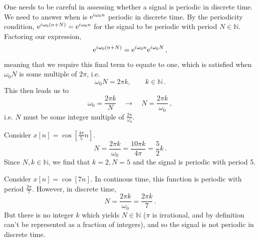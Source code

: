 %
One needs to be careful in assessing whether a signal is periodic in discrete time.
We need to answer when is $\mathrm{e}^{{i\mkern1mu}\omega_0 n}$ periodic in discrete time. By
the periodicity condition, $\mathrm{e}^{{i\mkern1mu}\omega_0(n+N)} = \mathrm{e}^{{i\mkern1mu}\omega_0n}$ for the signal
to be periodic with period $N\in\mathbb{N}$. Factoring our expression,
%
\begin{displaymath}
  \mathrm{e}^{{i\mkern1mu}\omega_0(n+N)} = \mathrm{e}^{{i\mkern1mu}\omega_0n}\mathrm{e}^{{i\mkern1mu}\omega_0N} \,,
\end{displaymath}
%
meaning that we require this final term to equate to one, which is satisfied when $\omega_0N$
is some multiple of $2\pi$, i.e.
%
\begin{displaymath}
  \omega_0N = 2\pi k, \qquad k\in\mathbb{N} \,.
\end{displaymath}
%
This then leads us to
%
\begin{displaymath}
  \omega_0 = \frac{2\pi k}{N} \quad\rightarrow\quad N = \frac{2\pi k}{\omega_0} \,,
\end{displaymath}
%
i.e. $N$ must be some integer multiple of $\frac{2\pi}{\omega_0}$.
%
\begin{exmp}
  Consider $x[n] = \cos[\frac{4\pi}{5}n]$.
  \begin{displaymath}
    N = \frac{2\pi k}{\omega_0} = \frac{10\pi k}{4\pi} = \frac{5}{2}k \,.
  \end{displaymath}
  Since $N,k\in\mathbb{N}$, we find that $k=2, N=5$ and the signal is periodic with
  period 5.
\end{exmp}
\begin{exmp}
  Consider $x[n] = \cos[7n]$. In continous time, this function is periodic with period
  $\frac{2\pi}{7}$. However, in discrete time,
  \begin{displaymath}
    N = \frac{2\pi k}{\omega_0} = \frac{2\pi k}{7} \,.
  \end{displaymath}
  But there is no integer $k$ which yields $N\in\mathbb{N}$ ($\pi$ is irrational, and by
  definition can't be represented as a fraction of integers), and so the signal is not
  periodic in discrete time.
\end{exmp}


